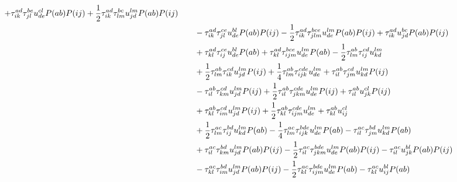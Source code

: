 \begin{align}
            + \clustamp^{ad}_{ik} \clustamp^{be}_{jl} u^{cl}_{de} P(ab) P(ij)
            + \frac{1}{2} \clustamp^{ad}_{ik} \clustamp^{bc}_{lm} u^{lm}_{jd} P(ab) P(ij)
            \nonumber \\
            &\qquad
            - \clustamp^{ad}_{ik} \clustamp^{ce}_{jl} u^{bl}_{de} P(ab) P(ij)
            - \frac{1}{2} \clustamp^{ad}_{ik} \clustamp^{bce}_{jlm} u^{lm}_{de} P(ab) P(ij)
            + \clustamp^{ad}_{ik} u^{bc}_{jd} P(ab) P(ij)
            \nonumber \\
            &\qquad
            + \clustamp^{ad}_{kl} \clustamp^{ce}_{ij} u^{bl}_{de} P(ab)
            + \clustamp^{ad}_{kl} \clustamp^{bce}_{ijm} u^{lm}_{de} P(ab)
            - \frac{1}{2} \clustamp^{ab}_{lm} \clustamp^{cd}_{ij} u^{lm}_{kd}
            \nonumber \\
            &\qquad
            + \frac{1}{2} \clustamp^{ab}_{lm} \clustamp^{cd}_{ik} u^{lm}_{jd} P(ij)
            + \frac{1}{4} \clustamp^{ab}_{lm} \clustamp^{cde}_{ijk} u^{lm}_{de}
            + \clustamp^{ab}_{il} \clustamp^{cd}_{jm} u^{lm}_{kd} P(ij)
            \nonumber \\
            &\qquad
            - \clustamp^{ab}_{il} \clustamp^{cd}_{km} u^{lm}_{jd} P(ij)
            + \frac{1}{2} \clustamp^{ab}_{il} \clustamp^{cde}_{jkm} u^{lm}_{de} P(ij)
            + \clustamp^{ab}_{il} u^{cl}_{jk} P(ij)
            \nonumber \\
            &\qquad
            + \clustamp^{ab}_{kl} \clustamp^{cd}_{im} u^{lm}_{jd} P(ij)
            + \frac{1}{2} \clustamp^{ab}_{kl} \clustamp^{cde}_{ijm} u^{lm}_{de}
            + \clustamp^{ab}_{kl} u^{cl}_{ij}
            \nonumber \\
            &\qquad
            + \frac{1}{2} \clustamp^{ac}_{lm} \clustamp^{bd}_{ij} u^{lm}_{kd} P(ab)
            - \frac{1}{4} \clustamp^{ac}_{lm} \clustamp^{bde}_{ijk} u^{lm}_{de} P(ab)
            - \clustamp^{ac}_{il} \clustamp^{bd}_{jm} u^{lm}_{kd} P(ab)
            \nonumber \\
            &\qquad
            + \clustamp^{ac}_{il} \clustamp^{bd}_{km} u^{lm}_{jd} P(ab) P(ij)
            - \frac{1}{2} \clustamp^{ac}_{il} \clustamp^{bde}_{jkm} u^{lm}_{de} P(ab) P(ij)
            - \clustamp^{ac}_{il} u^{bl}_{jk} P(ab) P(ij)
            \nonumber \\
            &\qquad
            - \clustamp^{ac}_{kl} \clustamp^{bd}_{im} u^{lm}_{jd} P(ab) P(ij)
            - \frac{1}{2} \clustamp^{ac}_{kl} \clustamp^{bde}_{ijm} u^{lm}_{de} P(ab)
            - \clustamp^{ac}_{kl} u^{bl}_{ij} P(ab)

\end{align}
